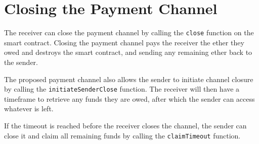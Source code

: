 \section{Closing the Payment Channel}\label{sec:closing-the-payment-channel}
The receiver can close the payment channel by calling the \texttt{close} function
on the smart contract.
Closing the payment channel pays the receiver the ether they owed and destroys
the smart contract, and sending any remaining ether back to the sender.



The proposed payment channel also allows the sender to initiate channel closure
by calling the \texttt{initiateSenderClose} function.
The receiver will then have a timeframe to retrieve any funds they are owed,
after which the sender can access whatever is left.



If the timeout is reached before the receiver closes the channel, the sender can
close it and claim all remaining funds by calling the \texttt{claimTimeout}
function.


